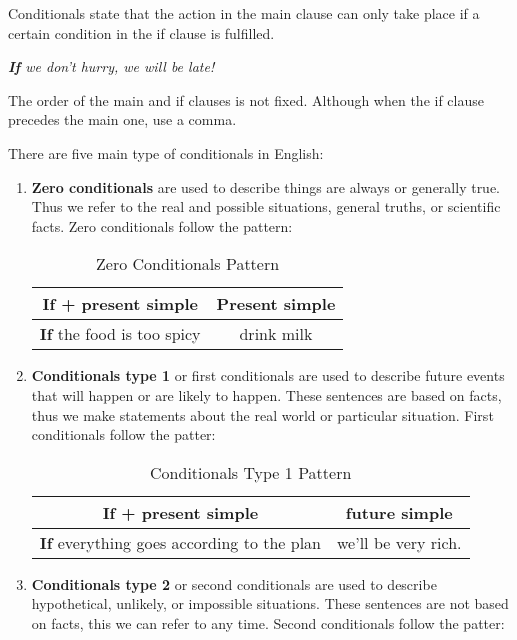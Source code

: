 \documentclass[hidelinks,10pt,a4paper]{article}
\begin{document}
Conditionals state that the action in the main clause can only take place if a certain condition in the if clause is fulfilled.

\begin{center}
	\textit{\textbf{If} we don't hurry, we will be late!}
\end{center}

The order of the main and if clauses is not fixed. Although when the if clause precedes the main one, use a comma.

\newpage
There are five main type of conditionals in English:

\begin{enumerate}[label=(\alph*)]
	\item \textbf{Zero conditionals} are used to describe things are always or generally true. Thus we refer to the real and possible situations, general truths, or scientific facts. Zero conditionals follow the pattern:
		\begin{table}[h]
		\begin{center}
		\begin{tabular}{|c|c|}
			\hline
			\textbf{If + present simple} & \textbf{Present simple} \\ \hline
			\textbf{If} the food is too spicy & drink milk \\ \hline
		\end{tabular}
		\end{center}
		\caption{Zero Conditionals Pattern} \label{tab:zcp}
		\end{table}
	\item \textbf{Conditionals type 1} or first conditionals are used to describe future events that will happen or are likely to happen. These sentences are based on facts, thus we make statements about the real world or particular situation. First conditionals follow the patter:
		\begin{table}[h]
		\begin{center}
		\begin{tabular}{|c|c|}
			\hline
			\textbf{If + present simple} & \textbf{future simple}\\ \hline
			\textbf{If} everything goes according to the plan & we'll be very rich. \\ \hline
		\end{tabular}
		\end{center}
		\caption{Conditionals Type 1 Pattern} \label{tab:ct1}
		\end{table}
	\item \textbf{Conditionals type 2} or second conditionals are used to describe hypothetical, unlikely, or impossible situations. These sentences are not based on facts, this we can refer to any time. Second conditionals follow the patter:

\end{enumerate}
\end{document}
